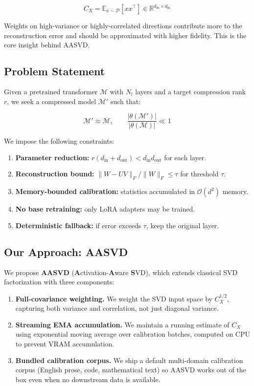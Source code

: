\[
C_X = \mathbb{E}_{x \sim \mathcal{D}}\!\left[x x^\top\right] \in \mathbb{R}^{d_\text{in} \times d_\text{in}}
\tag{1.1}
\]

Weights on high-variance or highly-correlated directions contribute more 
to the reconstruction error and should be approximated with higher fidelity. 
This is the core insight behind AASVD.

\subsection{Problem Statement}

Given a pretrained transformer $\mathcal{M}$ with $N_l$ layers and a target 
compression rank $r$, we seek a compressed model $\mathcal{M}'$ such that:

\[
\mathcal{M}' \approx \mathcal{M}, \qquad
\frac{|\theta(\mathcal{M}')|}{|\theta(\mathcal{M})|} \ll 1
\tag{1.2}
\]

We impose the following constraints:

\begin{enumerate}
\item \textbf{Parameter reduction:} $r(d_\text{in} + d_\text{out}) < d_\text{in} d_\text{out}$ for each layer.
\item \textbf{Reconstruction bound:} $\|W - UV\|_F / \|W\|_F \leq \tau$ for threshold $\tau$.
\item \textbf{Memory-bounded calibration:} statistics accumulated in $\mathcal{O}(d^2)$ memory.
\item \textbf{No base retraining:} only LoRA adapters may be trained.
\item \textbf{Deterministic fallback:} if error exceeds $\tau$, keep the original layer.

\end{enumerate}
\subsection{Our Approach: AASVD}

We propose \textbf{AASVD} (\textbf{A}ctivation-\textbf{A}ware \textbf{S}VD), which extends classical 
SVD factorization with three components:

\begin{enumerate}
\item \textbf{Full-covariance weighting.} We weight the SVD input space by
  $C_X^{1/2}$, capturing both variance and correlation, not just diagonal
  variance.

\item \textbf{Streaming EMA accumulation.} We maintain a running estimate of $C_X$
  using exponential moving average over calibration batches, computed
  on CPU to prevent VRAM accumulation.

\item \textbf{Bundled calibration corpus.} We ship a default multi-domain calibration
  corpus (English prose, code, mathematical text) so AASVD works out of the
  box even when no downstream data is available.

\end{enumerate}
